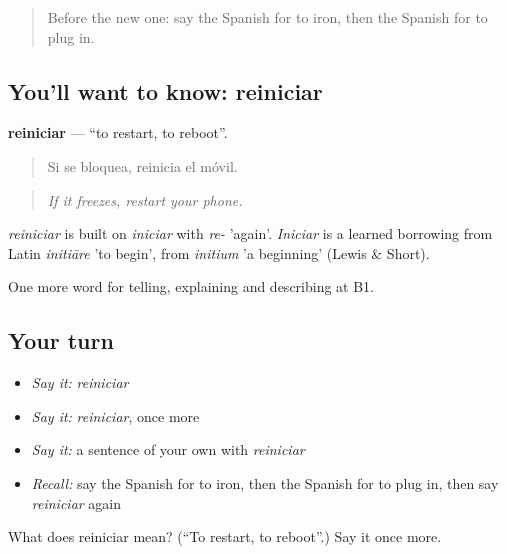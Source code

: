 \label{lesson:ES-C777-reiniciar}



\begin{quote}
Before the new one: say the Spanish for to iron, then the Spanish for to plug in.
\end{quote}

\subsection*{You'll want to know: reiniciar}
\textbf{reiniciar} — \textquotedblleft{}to restart, to reboot\textquotedblright{}.

\begin{quote}
Si se bloquea, reinicia el móvil.
\end{quote}

\begin{quote}
\emph{If it freezes, restart your phone.}
\end{quote}

\begin{cousinweb}
\emph{reiniciar} is built on \emph{iniciar} with \emph{re-} 'again'. \emph{Iniciar} is a learned borrowing from Latin \emph{initiāre} 'to begin', from \emph{initium} 'a beginning' (Lewis \& Short).
\end{cousinweb}

\begin{grammarlens}[title={What you've built}]
One more word for telling, explaining and describing at B1.
\end{grammarlens}

\subsection*{Your turn}
\begin{itemize}
\raggedright
  \item \emph{Say it:} \emph{reiniciar}
  \item \emph{Say it:} \emph{reiniciar}, once more
  \item \emph{Say it:} a sentence of your own with \emph{reiniciar}
  \item \emph{Recall:} say the Spanish for to iron, then the Spanish for to plug in, then say \emph{reiniciar} again
\end{itemize}

\begin{tcolorbox}[breakable,colback=teal!4,colframe=teal!35!black,title={Before you move on}]
What does reiniciar mean? (\textquotedblleft{}To restart, to reboot\textquotedblright{}.) Say it once more.
\end{tcolorbox}
